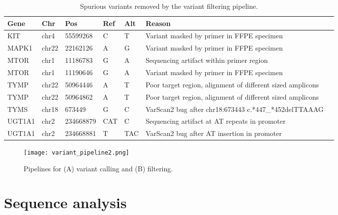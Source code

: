 \begin{table}[H]
\caption{Spurious variants removed by the variant filtering pipeline.}
\label{tbl:spurious_calls}
\centering
      \begin{tabular}{lllllll}
        \hline
        Gene & Chr & Pos & Ref & Alt & Reason
				\\
				\hline
				KIT & chr4 & 55599268 & C & T & Variant masked by primer in FFPE specimen
				\\
        MAPK1 & chr22 & 22162126 & A & G & Variant masked by primer in FFPE specimen
        \\
        MTOR & chr1 & 11186783 & G & A & Sequencing artifact within primer region
        \\
        MTOR & chr1 & 11190646 & G & A & Variant masked by primer in FFPE specimen
        \\
        TYMP & chr22 & 50964446 & A & T & Poor target region, alignment of different sized amplicons
        \\
        TYMP & chr22 & 50964862 & A & T & Poor target region, alignment of different sized amplicons
        \\
        TYMS & chr18 & 673449 & G & C & VarScan2 bug after chr18:673443 c.*447\_*452delTTAAAG
        \\
        UGT1A1 & chr2 & 234668879 & CAT & C & Sequencing artifact at AT repeats in promoter
        \\
        UGT1A1 & chr2 & 234668881 & T & TAC & VarScan2 bug after AT insertion in promoter
        \\
				\hline
      \end{tabular}
\end{table}


\begin{figure}[H]
\centering
	\texttt{[image: variant\_pipeline2.png]}
	\caption{Pipelines for (A) variant calling and (B) filtering.}
	\label{fig:variant_pipeline}
\end{figure}

\section{Sequence analysis}
\label{sec:Sequenceanalysis}

